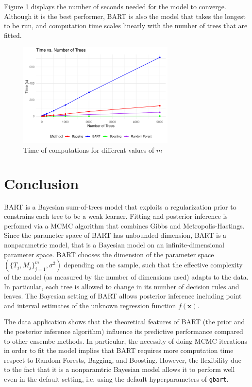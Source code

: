 \documentclass[a4paper,11pt]{article}
\begin{document}
Figure \ref{plot_time} displays the number of seconds needed for the model to converge. Although it is the best performer, BART is also the model that takes the longest to be run, and computation time scales linearly with the number of trees that are fitted.
\begin{figure}[h]
  \centering
  \includegraphics[width=0.7\textwidth]{outputs/time_plot.pdf}
  \caption{Time of computations for different values of $m$}
  \label{plot_time}
\end{figure}


\section{Conclusion}
\label{conclusion}
BART is a Bayesian sum-of-trees model that exploits a regularization prior to constrains each tree to be a weak learner. Fitting and posterior inference is perfomed via a MCMC algorithm that combines Gibbs and Metropolis-Hastings. Since the parameter space of BART has unbounded dimension, BART is a nonparametric model, that is a Bayesian model on an infinite-dimensional
parameter space. BART chooses the dimension of the parameter space $ (\{T_j, M_j\}_{j=1}^m, \sigma^2) $ depending on the sample, such that the effective complexity of the model (as measured by the
number of dimensions used) adapts to the data. In particular, each tree is allowed to change in its number of decision rules and leaves. 
The Bayesian setting of BART allows posterior inference including point and interval estimates of the unknown regression function $f(\mathbf{x})$. 

The data application shows that the theoretical features of BART (the prior and the posterior inference algorithm) influence its predictive performance compared to other ensembe methods. In particular, the necessity of doing MCMC iterations in order to fit the model implies that BART requires more computation time respect to Random Forests, Bagging, and Boosting. However, the flexibility due to the fact that it is a nonparamtric Bayesian model allows it to perform well even in the default setting, i.e. using the default hyperparameters of \texttt{gbart}.
 
\end{document}
